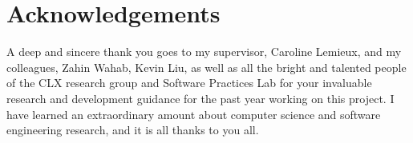 \chapter{Acknowledgements}
A deep and sincere thank you goes to my supervisor, Caroline Lemieux, and my colleagues, Zahin Wahab, Kevin Liu, as well as all the bright and talented people of the CLX research group and Software Practices Lab
for your invaluable research and development guidance for the past year working on this project. I have learned an extraordinary amount about computer science
and software engineering research, and it is all thanks to you all.

